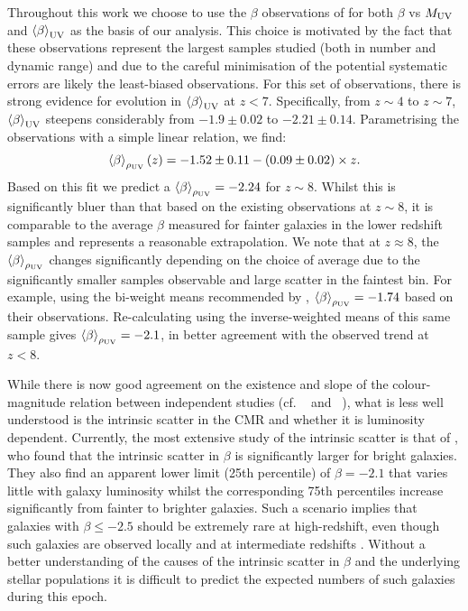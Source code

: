 Throughout this work we choose to use the $\beta$ observations of \citet{Bouwens:2013vf} for both $\beta$ vs $M_{\rm{UV}}$ and $\left \langle \beta  \right \rangle_{\rm{UV}}$ as the basis of our analysis. This choice is motivated by the fact that these observations represent the largest samples studied (both in number and dynamic range) and due to the careful minimisation of the potential systematic errors are likely the least-biased observations. For this set of observations, there is strong evidence for evolution in $\left \langle \beta  \right \rangle_{\rm{UV}}$ at $z < 7$. Specifically, from $z\sim4$ to $z\sim7$, $\left \langle \beta  \right \rangle_{\rm{UV}}$ steepens considerably from  $-1.9\pm0.02$  to $-2.21\pm0.14$. Parametrising the \citet{Bouwens:2013vf} observations with a simple linear relation, we find:
\begin{equation}\label{eq:beta_muv_fit}
    \left \langle \beta \right \rangle_{\rho_{\rm{UV}}}(z) = -1.52 \pm 0.11 - (0.09 \pm 0.02)\times z.
\end{equation}
Based on this fit we predict a $\left \langle \beta \right \rangle_{\rho_{\rm{UV}}} = -2.24$ for $z\sim8$. Whilst this is significantly bluer than that based on the existing observations at $z\sim8$, it is comparable to the average $\beta$ measured for fainter galaxies in the lower redshift samples and represents a reasonable extrapolation. We note that at $z\approx 8$, the $\left \langle \beta \right \rangle_{\rho_{\rm{UV}}}$ changes significantly depending on the choice of average due to the significantly smaller samples observable and large scatter in the faintest bin. For example, using the bi-weight means recommended by \citet{Bouwens:2013vf}, $\left \langle \beta \right \rangle_{\rho_{\rm{UV}}} = -1.74$ based on their observations. Re-calculating using the inverse-weighted means of this same sample gives $\left \langle \beta  \right \rangle_{\rho_{\rm{UV}}} = -2.1$, in better agreement with the observed trend at $z < 8$. 

While there is now good agreement on the existence and slope of the colour-magnitude relation between independent studies (cf.  \citeauthor{Bouwens:2013vf}~\citeyear{Bouwens:2013vf} and \citeauthor{Rogers:2014bn}~\citeyear{Rogers:2014bn}), what is less well understood is the intrinsic scatter in the CMR and whether it is luminosity dependent. Currently, the most extensive study of the intrinsic scatter is that of \citet{Rogers:2014bn}, who found that the intrinsic scatter in $\beta$ is significantly larger for bright galaxies. They also find an apparent lower limit (25th percentile) of $\beta = -2.1$ that varies little with galaxy luminosity whilst the corresponding 75th percentiles increase significantly from fainter to brighter galaxies. Such a scenario implies that galaxies with $\beta \leq -2.5$ should be extremely rare at high-redshift, even though such galaxies are observed locally and at intermediate redshifts \citep{Stark:2014fa}. Without a better understanding of the causes of the intrinsic scatter in $\beta$ and the underlying stellar populations it is difficult to predict the expected numbers of such galaxies during this epoch.

